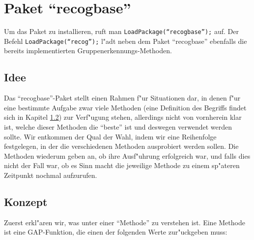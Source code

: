 \documentclass[a4paper,11pt]{article}
\theoremstyle{bla}
\begin{document}

\section{Paket "`recogbase"'}\label{recog}

Um das Paket zu installieren, ruft man \texttt{LoadPackage(``recogbase'');} auf. Der Befehl \texttt{LoadPackage(``recog'');} l"adt neben dem Paket "`recogbase"' ebenfalls die bereits implementierten Gruppenerkennungs-Methoden.


\subsection{Idee}

Das "`recogbase"'-Paket stellt einen Rahmen f"ur Situationen dar, in denen f"ur eine bestimmte Aufgabe zwar viele Methoden (eine Definition des Begriffs findet sich in Kapitel \ref{konzept}) zur Verf"ugung stehen, allerdings nicht von vornherein klar ist, welche dieser Methoden die "`beste"' ist und deswegen verwendet werden sollte. Wir entkommen der Qual der Wahl, indem wir eine Reihenfolge festgelegen, in der die verschiedenen Methoden ausprobiert werden sollen.
Die Methoden wiederum geben an, ob ihre Ausf"uhrung erfolgreich war, und falls dies nicht der Fall war, ob es Sinn macht die jeweilige Methode zu einem sp"ateren Zeitpunkt nochmal aufzurufen.


\subsection{Konzept}\label{konzept}

Zuerst erkl"aren wir, was unter einer "`Methode"' zu verstehen ist.
Eine Methode ist eine GAP-Funktion, die einen der folgenden Werte zur"uckgeben muss:
\end{document}
